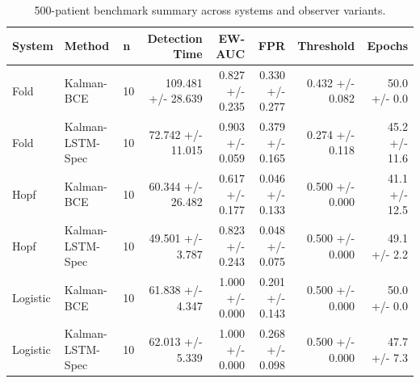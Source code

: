 \documentclass{article}
\begin{document}
\begin{table}[htbp]
  \centering
  \caption{500-patient benchmark summary across systems and observer variants.}
  \label{tab:benchmark_500}
  \begin{tabular}{lllrrrrr}
    \toprule
    System & Method & n & Detection Time & EW-AUC & FPR & Threshold & Epochs \\
    \midrule
    Fold & Kalman-BCE & 10 & 109.481 +/- 28.639 & 0.827 +/- 0.235 & 0.330 +/- 0.277 & 0.432 +/- 0.082 & 50.0 +/- 0.0 \\
    Fold & Kalman-LSTM-Spec & 10 & 72.742 +/- 11.015 & 0.903 +/- 0.059 & 0.379 +/- 0.165 & 0.274 +/- 0.118 & 45.2 +/- 11.6 \\
    Hopf & Kalman-BCE & 10 & 60.344 +/- 26.482 & 0.617 +/- 0.177 & 0.046 +/- 0.133 & 0.500 +/- 0.000 & 41.1 +/- 12.5 \\
    Hopf & Kalman-LSTM-Spec & 10 & 49.501 +/- 3.787 & 0.823 +/- 0.243 & 0.048 +/- 0.075 & 0.500 +/- 0.000 & 49.1 +/- 2.2 \\
    Logistic & Kalman-BCE & 10 & 61.838 +/- 4.347 & 1.000 +/- 0.000 & 0.201 +/- 0.143 & 0.500 +/- 0.000 & 50.0 +/- 0.0 \\
    Logistic & Kalman-LSTM-Spec & 10 & 62.013 +/- 5.339 & 1.000 +/- 0.000 & 0.268 +/- 0.098 & 0.500 +/- 0.000 & 47.7 +/- 7.3 \\
    \bottomrule
  \end{tabular}
\end{table}
\end{document}
